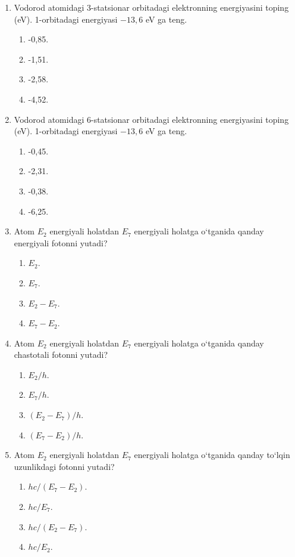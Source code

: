 \begin{enumerate}
\item Vodorod atomidagi 3-statsionar orbitadagi elektronning energiyasini toping (eV). 1-orbitadagi energiyasi $-13,6$ eV ga teng.
\begin{enumerate}[label=\Alph*)]
\item -0,85.
\item -1,51.
\item -2,58.
\item -4,52.
\end{enumerate}

\item Vodorod atomidagi 6-statsionar orbitadagi elektronning energiyasini toping (eV). 1-orbitadagi energiyasi $-13,6$ eV ga teng.
\begin{enumerate}[label=\Alph*)]
\item -0,45.
\item -2,31.
\item -0,38.
\item -6,25.
\end{enumerate}

\item Atom $E_2$ energiyali holatdan $E_7$ energiyali holatga o‘tganida qanday energiyali fotonni yutadi?
\begin{enumerate}[label=\Alph*)]
\item $E_2$.
\item $E_7$.
\item $E_2 - E_7$.
\item $E_7 - E_2$.
\end{enumerate}

\item Atom $E_2$ energiyali holatdan $E_7$ energiyali holatga o‘tganida qanday chastotali fotonni yutadi?
\begin{enumerate}[label=\Alph*)]
\item $E_2/h$.
\item $E_7/h$.
\item $(E_2 - E_7)/h$.
\item $(E_7 - E_2)/h$.
\end{enumerate}

\item Atom $E_2$ energiyali holatdan $E_7$ energiyali holatga o‘tganida qanday to‘lqin uzunlikdagi fotonni yutadi?
\begin{enumerate}[label=\Alph*)]
\item $hc/(E_7 - E_2)$.
\item $hc/E_7$.
\item $hc/(E_2 - E_7)$.
\item $hc/E_2$.
\end{enumerate}


\end{enumerate}

